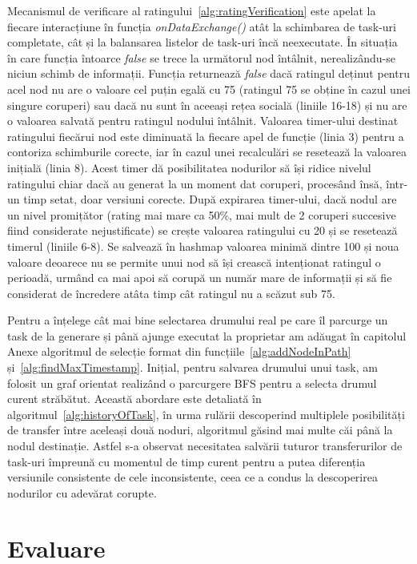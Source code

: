 \documentclass[12pt,a4paper]{report}
\begin{document}
Mecanismul de verificare al ratingului~\ref{alg:ratingVerification} este apelat la fiecare interacțiune în funcția \textit{onDataExchange()} atât la schimbarea de task-uri completate, cât și la balansarea listelor de task-uri încă neexecutate. În situația în care funcția întoarce \textit{false} se trece la următorul nod întâlnit, nerealizându-se niciun schimb de informații. Funcția returnează \textit{false} dacă ratingul deținut pentru acel nod nu are o valoare cel puțin egală cu 75 (ratingul 75 se obține în cazul unei singure coruperi) sau dacă nu sunt în aceeași rețea socială (liniile 16-18) și nu are o valoarea salvată pentru ratingul nodului întâlnit. Valoarea timer-ului destinat ratingului fiecărui nod este diminuată la fiecare apel de funcție (linia 3) pentru a contoriza schimburile corecte, iar în cazul unei recalculări se resetează la valoarea inițială (linia 8). Acest timer dă posibilitatea nodurilor să își ridice nivelul ratingului chiar dacă au generat la un moment dat coruperi, procesând însă, într-un timp setat, doar versiuni corecte. După expirarea timer-ului, dacă nodul are un nivel promițător (rating mai mare ca 50\%, mai mult de 2 coruperi succesive fiind considerate nejustificate) se crește valoarea ratingului cu 20 și se resetează timerul (liniile 6-8). Se salvează în hashmap valoarea minimă dintre 100 și noua valoare deoarece nu se permite unui nod să își crească intenționat ratingul o perioadă, urmând ca mai apoi să corupă un număr mare de informații și să fie considerat de încredere atâta timp cât ratingul nu a scăzut sub 75. 
 
Pentru a înțelege cât mai bine selectarea drumului real pe care îl parcurge un task de la generare și până ajunge executat la proprietar am adăugat în capitolul Anexe algoritmul de selecție format din funcțiile~\ref{alg:addNodeInPath} și~\ref{alg:findMaxTimestamp}. Inițial, pentru salvarea drumului unui task, am folosit un graf orientat realizând o parcurgere BFS pentru a selecta drumul curent străbătut. Această abordare este detaliată în algoritmul~\ref{alg:historyOfTask}, în urma rulării descoperind multiplele posibilități de transfer între aceleași două noduri, algoritmul găsind mai multe căi până la nodul destinație. Astfel s-a observat necesitatea salvării tuturor transferurilor de task-uri împreună cu momentul de timp curent pentru a putea diferenția versiunile consistente de cele inconsistente, ceea ce a condus la descoperirea nodurilor cu adevărat corupte.
\chapter{Evaluare} \label{evaluare}
\end{document}
